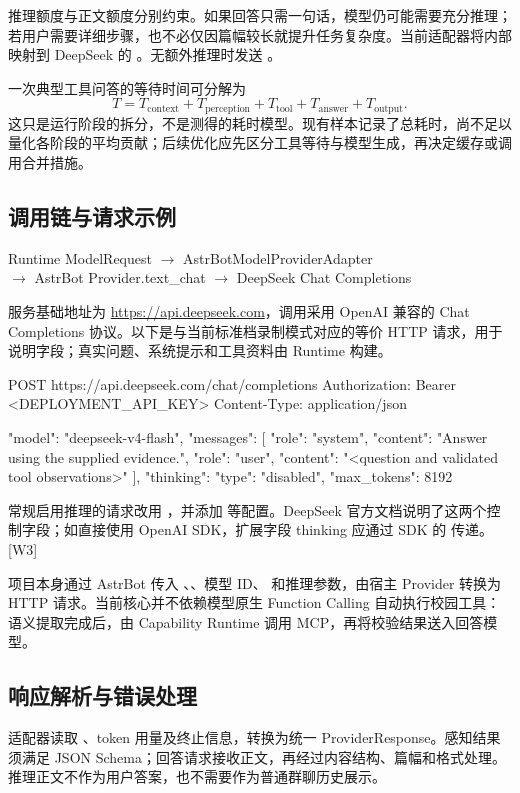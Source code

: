 推理额度与正文额度分别约束。如果回答只需一句话，模型仍可能需要充分推理；若用户需要详细步骤，也不必仅因篇幅较长就提升任务复杂度。当前适配器将内部  映射到 DeepSeek 的 。无额外推理时发送 。

一次典型工具问答的等待时间可分解为
\[
T=T_{\mathrm{context}}+T_{\mathrm{perception}}+T_{\mathrm{tool}}+T_{\mathrm{answer}}+T_{\mathrm{output}}.
\]
这只是运行阶段的拆分，不是测得的耗时模型。现有样本记录了总耗时，尚不足以量化各阶段的平均贡献；后续优化应先区分工具等待与模型生成，再决定缓存或调用合并措施。

\subsection{调用链与请求示例}
\begin{center}\small
Runtime ModelRequest $\rightarrow$ AstrBotModelProviderAdapter\\
$\rightarrow$ AstrBot Provider.text\_chat $\rightarrow$ DeepSeek Chat Completions
\end{center}
服务基础地址为 \url{https://api.deepseek.com}，调用采用 OpenAI 兼容的 Chat Completions 协议。以下是与当前标准档录制模式对应的等价 HTTP 请求，用于说明字段；真实问题、系统提示和工具资料由 Runtime 构建。

\begin{Code}
POST https://api.deepseek.com/chat/completions
Authorization: Bearer <DEPLOYMENT_API_KEY>
Content-Type: application/json

{
  "model": "deepseek-v4-flash",
  "messages": [
    {"role": "system", "content": "Answer using the supplied evidence."},
    {"role": "user", "content": "<question and validated tool observations>"}
  ],
  "thinking": {"type": "disabled"},
  "max_tokens": 8192
}
\end{Code}

常规启用推理的请求改用 ，并添加  等配置。DeepSeek 官方文档说明了这两个控制字段；如直接使用 OpenAI SDK，扩展字段 thinking 应通过 SDK 的  传递。[W3]

项目本身通过 AstrBot  传入 、、模型 ID、 和推理参数，由宿主 Provider 转换为 HTTP 请求。当前核心并不依赖模型原生 Function Calling 自动执行校园工具：语义提取完成后，由 Capability Runtime 调用 MCP，再将校验结果送入回答模型。

\subsection{响应解析与错误处理}
适配器读取 、token 用量及终止信息，转换为统一 ProviderResponse。感知结果须满足 JSON Schema；回答请求接收正文，再经过内容结构、篇幅和格式处理。推理正文不作为用户答案，也不需要作为普通群聊历史展示。

